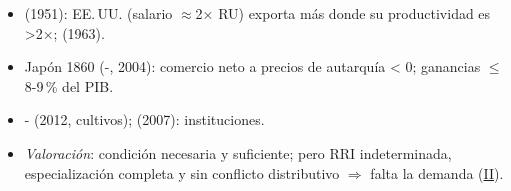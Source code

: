 \documentclass{article}
\begin{document}
\begin{columnas}
\begin{itemize}
\begin{itemize}
  \end{itemize}
\end{itemize}
\begin{itemize}
\item {} (1951): EE.\,UU. (salario $\approx$2× RU) exporta más donde su productividad es >2×;  (1963).
\item Japón 1860 (-, 2004): comercio neto a precios de autarquía < 0; ganancias $\le$8-9\,\% del PIB.
\item {}- (2012, cultivos);  (2007): instituciones.
\item \emph{Valoración}: condición necesaria y suficiente; pero RRI indeterminada, especialización completa y sin conflicto distributivo $\Rightarrow$ falta la demanda (\hyperref[rep:II]{II}).
\end{itemize}


\end{columnas}
\end{document}
